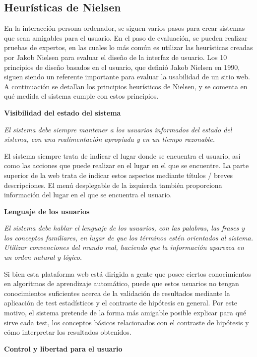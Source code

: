 \subsection{Heurísticas de Nielsen}
En la interacción persona-ordenador, se siguen varios pasos para crear sistemas que sean amigables para el usuario. En el paso de evaluación, se pueden realizar pruebas de expertos, en las cuales lo más común es utilizar las heurísticas creadas por Jakob Nielsen para evaluar el diseño de la interfaz de usuario. Los 10 principios de diseño basados en el usuario, que definió Jakob Nielsen en 1990, siguen siendo un referente importante para evaluar la usabilidad de un sitio web. A
continuación se detallan los principios heurísticos de Nielsen, y se comenta en qué medida el sistema cumple con estos principios.

\noindent
\textbf{Visibilidad del estado del sistema}

\textit{El sistema debe siempre mantener a los usuarios informados del estado del sistema, con una realimentación apropiada y en un tiempo razonable.}

El sistema siempre trata de indicar el lugar donde se encuentra el usuario, así como las acciones que puede realizar en el lugar en el que se encuentre. La parte superior de la web trata de indicar estos aspectos mediante títulos / breves descripciones. El menú desplegable de la izquierda también proporciona información del lugar en el que se encuentra el usuario.

\noindent
\textbf{Lenguaje de los usuarios}

\textit{El sistema debe hablar el lenguaje de los usuarios, con las palabras, las frases y los conceptos familiares, en lugar de que los términos estén orientados al sistema. Utilizar convenciones del mundo real, haciendo que la información aparezca en un orden natural y lógico.}

Si bien esta plataforma web está dirigida a gente que posee ciertos conocimientos en algoritmos de aprendizaje automático, puede que estos usuarios no tengan conocimientos suficientes acerca de la validación de resultados mediante la aplicación de test estadísticos y el contraste de hipótesis en general. Por este motivo, el sistema pretende de la forma más amigable posible explicar para qué sirve cada test, los conceptos básicos relacionados con el contraste de hipótesis y cómo interpretar los resultados obtenidos.

\noindent
\textbf{Control y libertad para el usuario}

